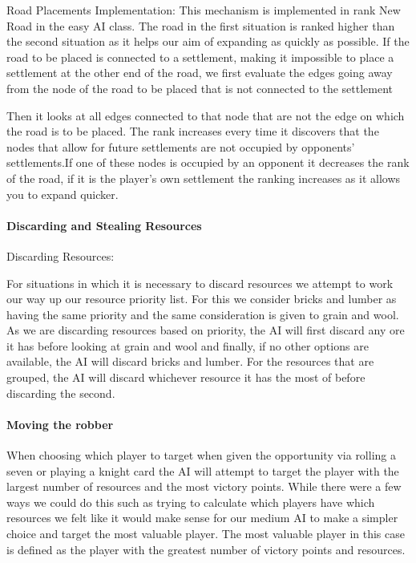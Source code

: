 \documentclass[a4paper,doc]{apa6}
\begin{document}
Road Placements Implementation:
	This mechanism is implemented in rank New Road in the easy AI class. The road in the first situation is ranked higher than the second situation as it helps our aim of expanding as quickly as possible. If the road to be placed is connected to a settlement, making it impossible to place a settlement at the other end of the road, we first evaluate the edges going away from the node of the road to be placed that is not connected to the settlement

Then it looks at all edges connected to that node that are not the edge on which the road is to be placed. The rank increases every time it discovers that the nodes that allow for future settlements are not occupied by opponents’ settlements.If one of these nodes is occupied by an opponent it decreases the rank of the road, if it is the player’s own settlement the ranking increases as it allows you to expand quicker.


\paragraph{Discarding and Stealing Resources}
Discarding Resources:

For situations in which it is necessary to discard resources we attempt to work our way up our resource priority list. For this we consider bricks and lumber as having the same priority and the same consideration is given to grain and wool. As we are discarding resources based on priority, the AI will first discard any ore it has before looking at grain and wool and finally, if no other options are available, the AI will discard bricks and lumber. For the resources that are grouped, the AI will discard whichever resource it has the most of before discarding the second.

\paragraph{Moving the robber}
When choosing which player to target when given the opportunity via rolling a seven or playing a knight card the AI will attempt to target the player with the largest number of resources and the most victory points. While there were a few ways we could do this such as trying to calculate which players have which resources we felt like it would make sense for our medium AI to make a simpler choice and target the most valuable player. The most valuable player in this case is defined as the player with the greatest number of victory points and resources.
\end{document}
